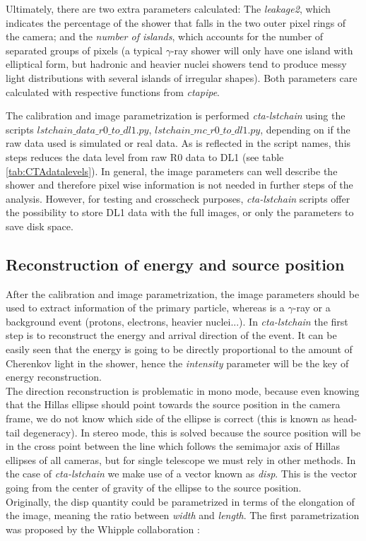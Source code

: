\documentclass[main.tex]{subfiles}
\begin{document}
Ultimately, there are two extra parameters calculated: The \textit{leakage2}, which indicates the percentage of the shower that falls in the two outer pixel rings of the camera; and the \textit{number of islands}, which accounts for the number of separated groups of pixels (a typical $\gamma$-ray shower will only have one island with elliptical form, but hadronic and heavier nuclei showers tend to produce messy light distributions with several islands of irregular shapes). Both parameters care calculated with respective functions from \textit{ctapipe}.

The calibration and image parametrization is performed \textit{cta-lstchain} using the scripts \textit{$lstchain\_data\_r0\_to\_dl1.py$}, \textit{$lstchain\_mc\_r0\_to\_dl1.py$}, depending on if the raw data used is simulated or real data. As is reflected in the script names, this steps reduces the data level from raw R0 data to DL1 (see table \ref{tab:CTAdatalevels}). In general, the image parameters can well describe the shower and therefore pixel wise information is not needed in further steps of the analysis. However, for testing and crosscheck purposes, \textit{cta-lstchain} scripts offer the possibility to store DL1 data with the full images, or only the parameters to save disk space.


\subsection{Reconstruction of energy and source position}

After the calibration and image parametrization, the image parameters should be used to extract information of the primary particle, whereas is a $\gamma$-ray or a background event (protons, electrons, heavier nuclei...). In \textit{cta-lstchain} the first step is to reconstruct the energy and arrival direction of the event. It can be easily seen that the energy is going to be directly proportional to the amount of Cherenkov light in the shower, hence the \textit{intensity} parameter will be the key of energy reconstruction.\\
The direction reconstruction is problematic in mono mode, because even knowing that the Hillas ellipse should point towards the source position in the camera frame, we do not know which side of the ellipse is correct (this is known as head-tail degeneracy). In stereo mode, this is solved because the source position will be in the cross point between the line which follows the semimajor axis of Hillas ellipses of all cameras, but for single telescope we must rely in other methods. In the case of \textit{cta-lstchain} we make use of a vector known as \textit{disp}. This is the vector going from the center of gravity of the ellipse to the source position.\\
Originally, the disp quantity could be parametrized in terms of the elongation of the image, meaning the ratio between \textit{width} and \textit{length}. The first parametrization was proposed by the Whipple collaboration \cite{1994dispwhipple}:
\end{document}
